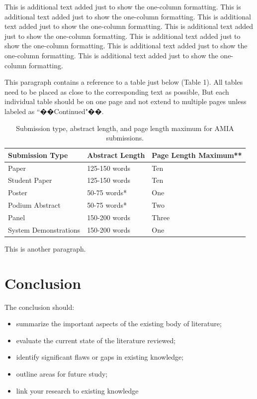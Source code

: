 \documentclass{amia}
\begin{document}
This is additional text added just to show the one-column formatting.  This is additional text added just to show the one-column formatting.  This is additional text added just to show the one-column formatting.  This is additional text added just to show the one-column formatting.  This is additional text added just to show the one-column formatting.  This is additional text added just to show the one-column formatting.  This is additional text added just to show the one-column formatting.

This paragraph contains a reference to a table just below (Table 1).  All tables need to be placed as close to the corresponding text as possible, But each individual table should be on one page and not extend to multiple pages unless labeled as ``��Continued"��.

\begin{table}[h]
\centering
\caption{Submission type, abstract length, and page length maximum for AMIA submissions.}
  \begin{tabular}{|l|l|l|}
  \hline
    \textbf{Submission Type}    & \textbf{Abstract Length}  & \textbf{Page Length Maximum**} \\ \hline
    Paper  & 125-150 words  & Ten   \\ \hline
    Student Paper  & 125-150 words  & Ten \\ \hline
    Poster  &50-75 words*   & One \\ \hline
    Podium  Abstract & 50-75 words*  & Two \\ \hline
    Panel   &150-200 words  & Three \\ \hline
    System Demonstrations    &150-200 words  & One \\ \hline
  \end{tabular}
\end{table}


This is another paragraph.

\section{Conclusion}

The conclusion should:
\begin{itemize}
    \item summarize the important aspects of the existing body of literature;
    \item evaluate the current state of the literature reviewed;
    \item identify significant flaws or gaps in existing knowledge;
    \item outline areas for future study;
    \item link your research to existing knowledge
\end{itemize}

\makeatletter
\renewcommand{\@biblabel}[1]{\hfill #1.}
\makeatother





\end{document}
